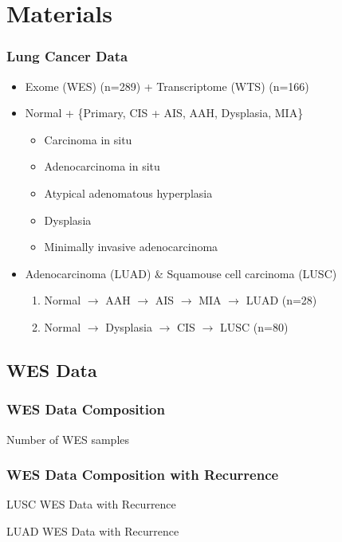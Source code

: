 \documentclass{beamer}
\begin{document}
    \section{Materials}
    \begin{frame}
        \frametitle{Lung Cancer Data}

        \begin{itemize}
            \item Exome (WES) (n=289) + Transcriptome (WTS) (n=166)
            \item Normal + \{Primary, CIS + AIS, AAH, Dysplasia, MIA\}
            \begin{itemize}
                \item Carcinoma in situ
                \item Adenocarcinoma in situ
                \item Atypical adenomatous hyperplasia
                \item Dysplasia
                \item Minimally invasive adenocarcinoma
            \end{itemize}
            \item Adenocarcinoma (LUAD) \& Squamouse cell carcinoma (LUSC)
            \begin{enumerate}
                \item Normal $\rightarrow$ AAH $\rightarrow$ AIS $\rightarrow$ MIA $\rightarrow$ LUAD (n=28)
                \item Normal $\rightarrow$ Dysplasia $\rightarrow$ CIS $\rightarrow$ LUSC (n=80)
            \end{enumerate}
        \end{itemize}
    \end{frame}

    \subsection{WES Data}
    \begin{frame}
        \frametitle{WES Data Composition}

        \begin{table}
            \caption{Number of WES samples}
            \resizebox{!}{0.3 \textheight}
            {}
        \end{table}
    \end{frame}

    \begin{frame}[allowframebreaks]
        \frametitle{WES Data Composition with Recurrence}

        \begin{table}
            \caption{LUSC WES Data with Recurrence}
            \resizebox{!}{0.3 \textheight}
            {}
        \end{table}

        \begin{table}
            \caption{LUAD WES Data with Recurrence}
            
        \end{table}
    \end{frame}
\end{document}
